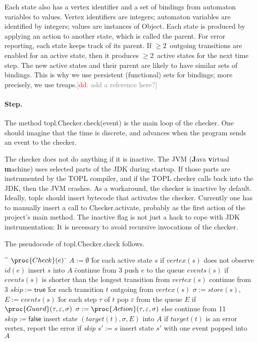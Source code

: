 \documentclass{sigplanconf}[10pt] %
\newcommand{\noterg}[2]{\textcolor{gray}{[\textcolor{red}{#1}: #2]}}
\newcommand{\dd}[1]{\noterg{dd}{#1}}
\newcommand{\dinocomment}[1]{\dd{#1}}
\begin{document}
Each state also has a vertex identifier and a set of bindings from automaton variables to values.
Vertex identifiers are integers; automaton variables are identified by integers; values are instances of \textsf{Object}.
Each state is produced by applying an action to another state, which is called the parent.
For error reporting, each state keeps track of its parent.
If $\ge2$~outgoing transitions are enabled for an active state, then it produces $\ge2$~active states for the next time step.
The new active states and their parent are likely to have similar sets of bindings.
This is why we use persistent (functional) sets for bindings; more precisely, we use treaps.\dinocomment{add a reference here?}

\paragraph{Step.}
The method \textsf{topl.Checker.check(event)} is the main loop of the checker.
One should imagine that the time is discrete, and advances when the program sends an event to the checker.

The checker does not do anything if it is inactive.
The JVM (\textbf Java \textbf virtual \textbf machine) uses selected parts of the JDK during startup.
If those parts are instrumented by the TOPL compiler, and if the TOPL checker calls back into the JDK, then the JVM crashes.
As a workaround, the checker is inactive by default.
Ideally, \textsf{toplc} should insert bytecode that activates the checker.
Currently one has to manually insert a call to \textsf{Checker.activate}, probably as the first action of the project's \textsf{main} method.
The inactive flag is not just a hack to cope with JDK instrumentation:
It is necessary to avoid recursive invocations of the checker.

The pseudocode of \textsf{topl.Checker.check} follows.

\begin{alg}
\^  $\proc{Check}(e)$
\=  $A := \emptyset$
\=  for each active state $s$
\+    if $\mathit{vertex}(s)$ does not observe $\mathit{id}(e)$
\+      insert $s$ into $A$
\=      continue from $3$
\-    push $e$ to the queue $\mathit{events}(s)$
\=    if $\mathit{events}(s)$ is shorter than the longest transition from $\mathit{vertex}(s)$
\+      continue from $3$
\1    $\mathit{skip}:=\mathsf{true}$
\=    for each transition $t$ outgoing from $\mathit{vertex}(s)$
\+      $\sigma := \mathit{store}(s)$,\quad $E := \mathit{events}(s)$
\=      for each step $\tau$ of $t$
\+        pop $\varepsilon$ from the queue $E$
\+        if $\proc{Guard}(\tau, \varepsilon, \sigma)$
\+          $\sigma := \proc{Action}(\tau, \varepsilon, \sigma)$
\-        else
\+          continue from 11
\2      $\mathit{skip}:=\mathsf{false}$
\=      insert state $(\mathit{target}(t), \sigma, E)$ into $A$
\=      if $\mathit{target}(t)$ is an error vertex, report the error
\=      if \textit{skip}
\+        $s' := s$
\=        insert state $s'$ with one event popped into $A$
\end{alg}
\end{document}
